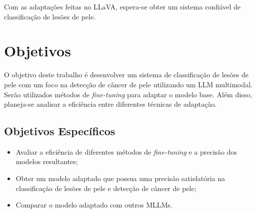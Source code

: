 Com as adaptações feitas no \ac{LLaVA}, espera-se obter um sistema confiável de classificação de lesões de pele.

\section{Objetivos}

O objetivo deste trabalho é desenvolver um sistema de classificação de lesões de pele com um foco na detecção de câncer de pele utilizando um \ac{LLM} multimodal.
Serão utilizados métodos de \textit{fine-tuning} para adaptar o modelo base. Além disso, planeja-se analisar a eficiência entre diferentes técnicas de adaptação.

\subsection*{Objetivos Específicos}

\begin{itemize}
    \item Avaliar a eficiência de diferentes métodos de \textit{fine-tuning} e a precisão dos modelos resultantes;
    \item Obter um modelo adaptado que possua uma precisão satisfatória na classificação de lesões de pele e detecção de câncer de pele;
    \item Comparar o modelo adaptado com outros \acp{MLLM}.
\end{itemize}
